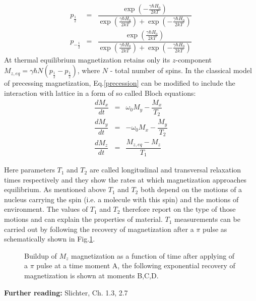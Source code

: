 \documentclass[a4paper, 12pt]{article}
\begin{document}
\begin{equation}
\begin{array} {lcl} \label{eq:populations}
p_{\frac{1}{2}} &=& \dfrac{\exp{ (-\frac{\gamma \hbar H_0}{2kT}) }}{\exp{ (\frac{\gamma \hbar H_0}{2kT}) }+\exp{ (-\frac{\gamma \hbar H_0}{2kT} )}} \\
p_{-\frac{1}{2}} &=& \dfrac{\exp{ (\frac{\gamma \hbar H_0}{2kT}) }}{\exp{ (\frac{\gamma \hbar H_0}{2kT}) }+\exp{ (-\frac{\gamma \hbar H_0}{2kT} )}}
\end{array}
\end{equation}
 At thermal equilibrium magnetization retains only its $z$-component $M_{z,eq} = \gamma \hbar N (p_{\frac{1}{2}} - p_{\frac{1}{2}}) $, where $N$ - total number of spins. In the classical model of precessing magnetization, Eq.\ref{precession} can be modified to include the interaction with lattice in a form of so called Bloch equations:
\begin{equation}
\begin{array}{lcl}
\dfrac{dM_x}{dt} & = & \omega_0 M_y - \dfrac{M_x}{T_2}  \\
\dfrac{dM_y}{dt} & = & -\omega_0 M_x - \dfrac{M_y}{T_2} \\
\dfrac{dM_z}{dt} & = & \dfrac{M_{z,eq}-M_z}{T_1} 
\end{array}
\end{equation} 

Here parameters $T_1$ and $T_2$ are called longitudinal and transversal relaxation times respectively and they show the rates at which magnetization approaches equilibrium. As mentioned above $T_1$ and $T_2$ both depend on the motions of a nucleus carrying the spin (i.e. a molecule with this spin) and the motions of environment. The values of $T_1$ and $T_2$ therefore report on the type of those motions and can explain the properties of material. 
$T_1$ measurements can be carried out by following the recovery of magnetization after a $\pi$ pulse as schematically shown in Fig.\ref{fig:mz_buildup}. 

\begin{figure}[ht]
\caption{Buildup of $M_z$ magnetization as a function of time after applying of a $\pi$ pulse at a time moment A, the following exponential recovery of magnetization is shown at moments B,C,D.}
\label{fig:mz_buildup}
\centering
\end{figure}

\textbf{Further reading:} Slichter, Ch. 1.3, 2.7
\end{document}
